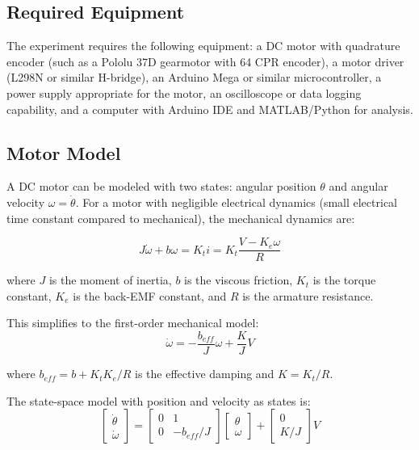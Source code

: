\subsection{Required Equipment}

The experiment requires the following equipment: a DC motor with quadrature encoder (such as a Pololu 37D gearmotor with 64 CPR encoder), a motor driver (L298N or similar H-bridge), an Arduino Mega or similar microcontroller, a power supply appropriate for the motor, an oscilloscope or data logging capability, and a computer with Arduino IDE and MATLAB/Python for analysis.

\subsection{Motor Model}

A DC motor can be modeled with two states: angular position $\theta$ and angular velocity $\omega = \dot{\theta}$. For a motor with negligible electrical dynamics (small electrical time constant compared to mechanical), the mechanical dynamics are:

\begin{equation}
J\dot{\omega} + b\omega = K_t i = K_t \frac{V - K_e\omega}{R}
\end{equation}

where $J$ is the moment of inertia, $b$ is the viscous friction, $K_t$ is the torque constant, $K_e$ is the back-EMF constant, and $R$ is the armature resistance.

This simplifies to the first-order mechanical model:
\begin{equation}
\dot{\omega} = -\frac{b_{eff}}{J}\omega + \frac{K}{J}V
\end{equation}

where $b_{eff} = b + K_t K_e/R$ is the effective damping and $K = K_t/R$.

The state-space model with position and velocity as states is:
\begin{equation}
\begin{bmatrix} \dot{\theta} \\ \dot{\omega} \end{bmatrix}
= \begin{bmatrix} 0 & 1 \\ 0 & -b_{eff}/J \end{bmatrix}
\begin{bmatrix} \theta \\ \omega \end{bmatrix}
+ \begin{bmatrix} 0 \\ K/J \end{bmatrix} V
\end{equation}

